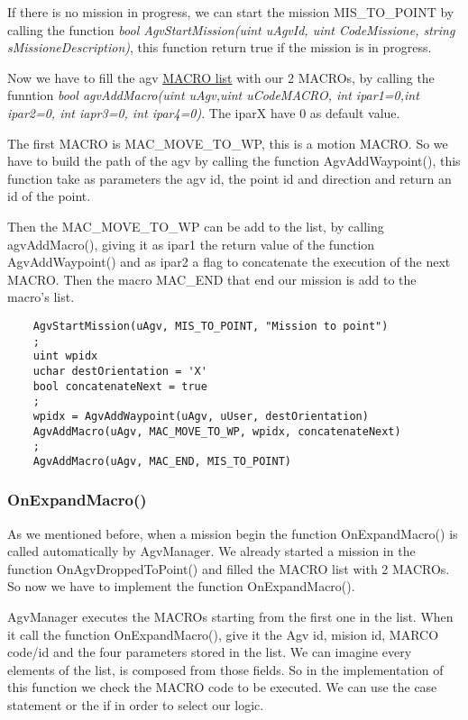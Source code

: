 If there is no mission in progress, we can start the mission MIS\_TO\_POINT by calling the function \textit{bool AgvStartMission(uint uAgvId, uint CodeMissione, string sMissioneDescription)}, this function return true if the mission is in progress.

Now we have to fill the agv \underline{MACRO list} with our 2 MACROs, by calling the funntion \textit{bool agvAddMacro(uint uAgv,uint uCodeMACRO, int ipar1=0,int ipar2=0, int iapr3=0, int ipar4=0)}. The iparX have 0 as default value.

The first MACRO is MAC\_MOVE\_TO\_WP, this is a motion MACRO. So we have to build the path of the agv by calling the function AgvAddWaypoint(), this function take as parameters the agv id, the point id and direction and return an id of the point.

Then the MAC\_MOVE\_TO\_WP can be add to the list, by calling agvAddMacro(), giving it as ipar1 the return value of the function AgvAddWaypoint() and as ipar2 a flag to concatenate the execution of the next MACRO.
Then the macro MAC\_END that end our mission is add to the macro's list.

\begin{lstlisting}
	AgvStartMission(uAgv, MIS_TO_POINT, "Mission to point")
	;
	uint wpidx
	uchar destOrientation = 'X'
	bool concatenateNext = true
	;
	wpidx = AgvAddWaypoint(uAgv, uUser, destOrientation)
	AgvAddMacro(uAgv, MAC_MOVE_TO_WP, wpidx, concatenateNext)
	;
	AgvAddMacro(uAgv, MAC_END, MIS_TO_POINT)
\end{lstlisting}	




\subsubsection{OnExpandMacro()}
As we mentioned before, when a mission begin the function OnExpandMacro() is called automatically by AgvManager. We already started a mission in the function  OnAgvDroppedToPoint() and filled the MACRO list with 2 MACROs. So now we have to implement the function OnExpandMacro().

AgvManager executes the MACROs starting from the first one in the list. When it call the function OnExpandMacro(), give it the Agv id, mision id, MARCO code/id and the four parameters stored in the list. We can imagine every elements of the list, is composed from those fields. So in the implementation of this function we check the MACRO code to be executed. We can use the case statement or the if in order to select our logic.

